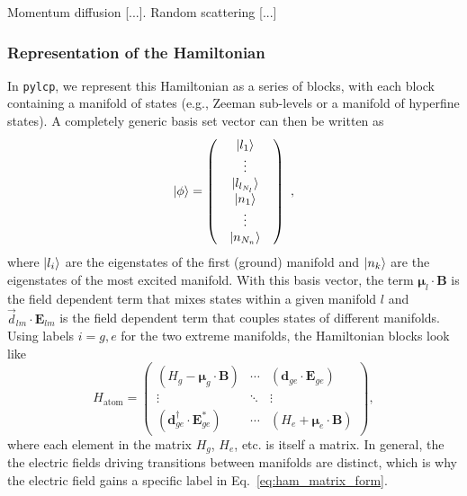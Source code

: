 \documentclass[final,5p,times,twocolumn]{elsarticle}
\begin{document}
Momentum diffusion [...]. Random scattering [...]

\subsubsection{Representation of the Hamiltonian}
In {\tt pylcp}, we represent this Hamiltonian as a series of blocks, with each block containing a manifold of states (e.g., Zeeman sub-levels or a manifold of hyperfine states). A completely generic basis set vector can then be written as
\begin{equation}
    \ket{\phi} = \left(\begin{array}{c} \begin{array}{c} \ket{l_1} \\ \vdots \\ \ket{l_{l_{N_l}}} \end{array} \\ \begin{array}{c} \ket{n_1} \\ \vdots \\ \ket{n_{N_n}} \end{array} \end{array}\right)\ ,
\end{equation}
where $\ket{l_i}$ are the eigenstates of the first (ground) manifold and $\ket{n_k}$ are
the eigenstates of the most excited manifold.  With this basis vector, the term $\boldsymbol{\mu}_l\cdot\mathbf{B}$ is the field dependent term that mixes states within a given manifold $l$ and $\vec{d}_{lm}\cdot\mathbf{E}_{lm}$ is the field dependent term that couples states of different manifolds.  Using labels $i=g,e$ for the two extreme manifolds, the Hamiltonian blocks look like
\begin{equation}
    \label{eq:ham_matrix_form}
    H_\text{atom} = \left(
    \begin{array}{ccc}
    (H_g - \boldsymbol{\mu}_g\cdot \mathbf{B}) & \cdots & (\boldsymbol{d}_{ge}\cdot\mathbf{E}_{ge}) \\
    \vdots & \ddots & \vdots  \\
    (\boldsymbol{d}_{ge}^\dagger\cdot\mathbf{E}_{ge}^*) & \cdots & (H_e+\boldsymbol{\mu}_e\cdot \mathbf{B})
    \end{array}\right),
\end{equation}
where each element in the matrix $H_g$, $H_e$, etc. is itself a matrix.  In general, the the electric fields driving transitions between manifolds are distinct, which is why the electric field gains a specific label in Eq.~\ref{eq:ham_matrix_form}.
\end{document}
